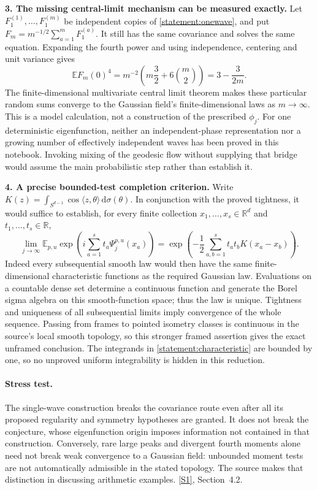 \documentclass[11pt,a4paper]{article}
\newcommand{\R}{\mathbb{R}}
\newcommand{\E}{\mathbb{E}}
\newcommand{\dd}{\,\mathrm d}
\newcommand{\sref}[2]{\hyperlink{source:#1:#2}{[S#2]}}
\numberwithin{equation}{section}
\begin{document}
\textbf{3. The missing central-limit mechanism can be measured exactly.}
Let $F_1^{(1)},\ldots,F_1^{(m)}$ be independent copies of
\eqref{statement:onewave}, and put $F_m=m^{-1/2}\sum_{a=1}^mF_1^{(a)}$.
It still has the same covariance and solves the same equation. Expanding
the fourth power and using independence, centering and unit variance gives
\[
 \E F_m(0)^4
 =m^{-2}\left(m\frac32+6\binom m2\right)
 =3-\frac{3}{2m}.
\]
The finite-dimensional multivariate central limit theorem makes these
particular random sums converge to the Gaussian field's finite-dimensional
laws as $m\to\infty$. This is a model calculation, not a construction of
the prescribed $\phi_j$. For one deterministic eigenfunction, neither an
independent-phase representation nor a growing number of effectively
independent waves has been proved in this notebook. Invoking mixing of
the geodesic flow without supplying that bridge would assume the main
probabilistic step rather than establish it.

\textbf{4. A precise bounded-test completion criterion.}
Write $K(z)=\int_{S^{d-1}}\cos\langle z,\theta\rangle\dd\sigma(\theta)$.
In conjunction with the proved tightness, it would suffice to establish,
for every finite collection $x_1,\ldots,x_s\in\R^d$ and
$t_1,\ldots,t_s\in\R$,
\begin{equation}\label{statement:characteristic}
 \lim_{j\to\infty}\E_{p,u}
    \exp\left(i\sum_{a=1}^s t_a\Psi_j^{p,u}(x_a)\right)
 =\exp\left(-\frac12\sum_{a,b=1}^s t_at_bK(x_a-x_b)\right).
\end{equation}
Indeed every subsequential smooth law would then have the same
finite-dimensional characteristic functions as the required Gaussian law.
Evaluations on a countable dense set determine a continuous function and
generate the Borel sigma algebra on this smooth-function space; thus the
law is unique. Tightness and uniqueness of all subsequential limits imply
convergence of the whole sequence. Passing from frames to pointed
isometry classes is continuous in the source's local smooth topology,
so this stronger framed assertion gives the exact unframed conclusion.
The integrands in \eqref{statement:characteristic} are bounded by one, so no
unproved uniform integrability is hidden in this reduction.

\paragraph{Stress test.}
The single-wave construction breaks the covariance route even after all
its proposed regularity and symmetry hypotheses are granted. It does not
break the conjecture, whose eigenfunction origin imposes information not
contained in that construction. Conversely, rare large peaks and divergent
fourth moments alone need not break weak convergence to a Gaussian field:
unbounded moment tests are not automatically admissible in the stated
topology. The source makes that distinction in discussing arithmetic
examples. \sref{statement}{1}, Section~4.2.
\end{document}
